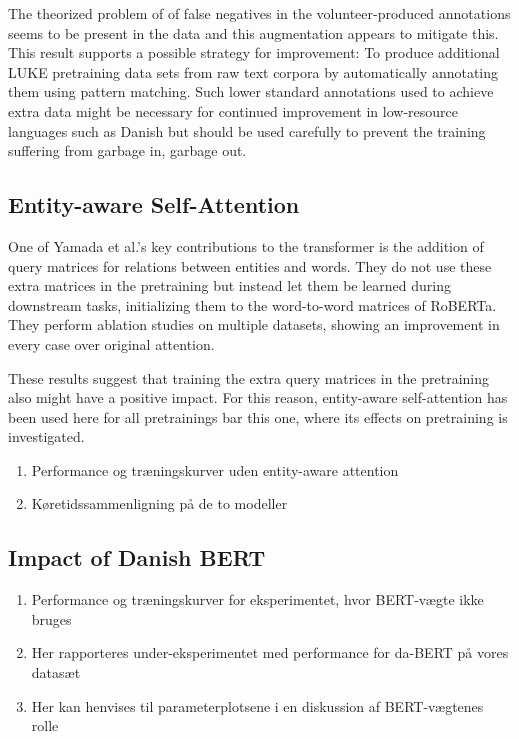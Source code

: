 \documentclass[main.tex]{subfiles}
\begin{document}
The theorized problem of of false negatives in the volunteer-produced annotations seems to be present in the data and this augmentation appears to mitigate this.
This result supports a possible strategy for improvement:
To produce additional LUKE pretraining data sets from raw text corpora by automatically annotating them using pattern matching.
Such lower standard annotations used to achieve extra data might be necessary for continued improvement in low-resource languages such as Danish but should be used carefully to prevent the training suffering from garbage in, garbage out.

\subsection{Entity-aware Self-Attention}
One of Yamada et al.'s key contributions to the transformer is the addition of query matrices for relations between entities and words.
They do not use these extra matrices in the pretraining but instead let them be learned during downstream tasks, initializing them to the word-to-word matrices of RoBERTa.
They perform ablation studies on multiple datasets, showing an improvement in every case over original attention.
\cite{yamada2020luke}

These results suggest that training the extra query matrices in the pretraining also might have a positive impact.
For this reason, entity-aware self-attention has been used here for all pretrainings bar this one, where its effects on pretraining is investigated.
\begin{enumerate}
    \item Performance og træningskurver uden entity-aware attention
    \item Køretidssammenligning på de to modeller
\end{enumerate}

\subsection{Impact of Danish BERT}
\begin{enumerate}
    \item Performance og træningskurver for eksperimentet, hvor BERT-vægte ikke bruges
    \item Her rapporteres under-eksperimentet med performance for da-BERT på vores datasæt
    \item Her kan henvises til parameterplotsene i en diskussion af BERT-vægtenes rolle
\end{enumerate}
\end{document}
